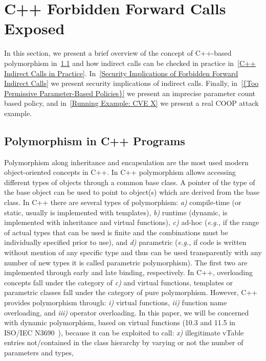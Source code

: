 \section{C++ Forbidden Forward Calls Exposed}
\label{C++ Bad Forward Indirect Calls}
In this section, we present a brief overview of the concept of C++-based polymorphism in~\cref{Polymorphism in C++}
and how indirect calls can be checked in practice in~\cref{C++ Indirect Calls in Practice}.
In~\cref{Security Implications of Forbidden Forward Indirect Calls} we present security implications of indirect calls.
Finally, in~\cref{{Too Permissive Parameter-Based Policies}} we present an imprecise parameter count based policy, and 
in~\cref{Running Example: CVE X} we present a real COOP attack example.

\subsection{Polymorphism in C++ Programs}
\label{Polymorphism in C++}
Polymorphism along inheritance and encapsulation
are the most used modern object-oriented concepts in C++. 
In C++ polymorphism allows accessing different types of objects 
through a common base class. A pointer of the type of the base object
can be used to point to object(s) which are derived from the base class.
In C++ there are several types of polymorphism:
\textit{a)} compile-time (or static, usually is implemented with templates), 
\textit{b)} runtime (dynamic, is implemented with inheritance and virtual functions), 
\textit{c)} ad-hoc (\textit{e.g.,} if the range of actual types that can be used is finite and the combinations must be individually specified prior to use), and
\textit{d)} parametric (\textit{e.g.,} if code is written without mention of any specific type and thus can be used transparently with any number of new types it is called parametric polymorphism). 
The first two are implemented through early 
and late binding, respectively.
In C++, overloading concepts fall under the category of \textit{c)} and virtual functions, templates or parametric classes fall under the category of pure polymorphism.
However, C++ provides polymorphism through: 
\textit{i)} virtual functions,
\textit{ii)} function name overloading, and 
\textit{iii)} operator overloading. 
In this paper, we will be concerned with dynamic polymorphism, based on virtual functions (10.3 and 11.5 in ISO/IEC N3690~\cite{iso:iecN3690}), because it can be exploited to call: 
\textit{x)} illegitimate vTable entries not/contained in the class hierarchy by varying or not the number of parameters and types,
